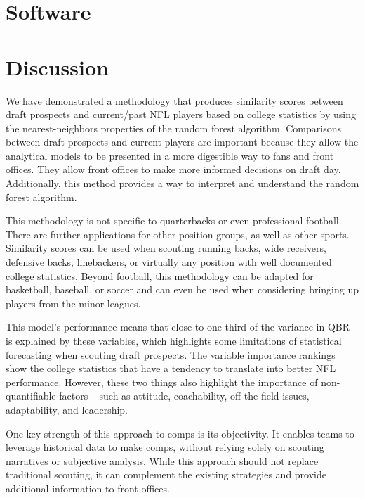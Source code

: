 \documentclass{article}
\begin{document}
\section{Software}
\label{sec:software}

\section{Discussion}
\label{sec:discussion}

We have demonstrated a methodology that produces similarity scores between draft prospects and current/past NFL players based on college statistics by using the nearest-neighbors properties of the random forest algorithm. Comparisons between draft prospects and current players are important because they allow the analytical models to be presented in a more digestible way to fans and front offices. They allow front offices to make more informed decisions on draft day. Additionally, this method provides a way to interpret and understand the random forest algorithm.

This methodology is not specific to quarterbacks or even professional football. There are further applications for other position groups, as well as other sports. Similarity scores can be used when scouting running backs, wide receivers, defensive backs, linebackers, or virtually any position with well documented college statistics. Beyond football, this methodology can be adapted for basketball, baseball, or soccer and can even be used when considering bringing up players from the minor leagues.

This model's performance means that close to one third of the variance in QBR is explained by these variables, which highlights some limitations of statistical forecasting when scouting draft prospects. The variable importance rankings show the college statistics that have a tendency to translate into better NFL performance. However, these two things also highlight the importance of non-quantifiable factors – such as attitude, coachability, off-the-field issues, adaptability, and leadership.

One key strength of this approach to comps is its objectivity. It enables teams to leverage historical data to make comps, without relying solely on scouting narratives or subjective analysis. While this approach should not replace traditional scouting, it can complement the existing strategies and provide additional information to front offices. 


\end{document}
